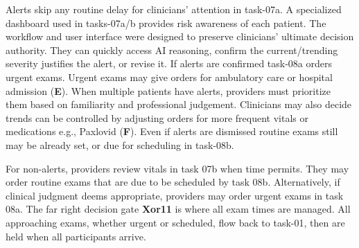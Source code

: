 Alerts skip any routine delay for clinicians' attention in task-07a. A specialized dashboard used in tasks-07a/b provides risk awareness of each patient.
The workflow and user interface were designed to preserve clinicians' ultimate decision authority.
They can quickly access AI reasoning, confirm the current/trending severity justifies the alert, or revise it.
If alerts are confirmed task-08a orders urgent exams.
Urgent exams may give orders for ambulatory care or hospital admission (\textbf{E}).
When multiple patients have alerts, providers must prioritize them based on familiarity and professional judgement.
Clinicians may also decide trends can be controlled by adjusting orders for more frequent vitals or medications e.g., Paxlovid (\textbf{F}).
Even if alerts are dismissed routine exams still may be already set, or due for scheduling in task-08b. 

For non-alerts, providers review vitals in task 07b when time permits. They may order routine exams that are due to be scheduled by task 08b.
Alternatively, if clinical judgment deems appropriate, providers may order urgent exams in task 08a.
The far right decision gate \textbf{Xor11} is where all exam times are managed.
All approaching exams, whether urgent or scheduled, flow back to task-01, then are held when all participants arrive.